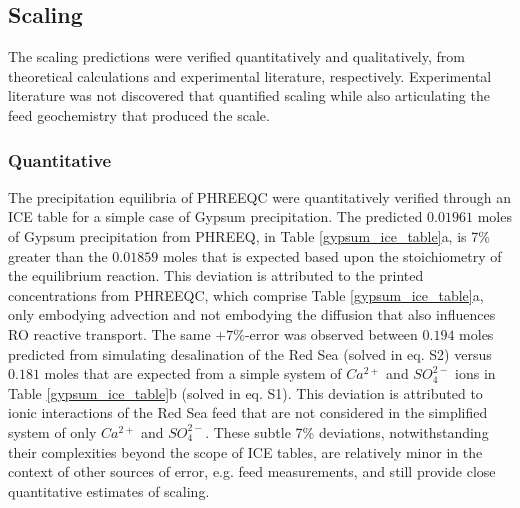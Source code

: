 \subsection{Scaling}
The scaling predictions were verified quantitatively and qualitatively, from theoretical calculations and experimental literature, respectively. Experimental literature was not discovered that quantified scaling while also articulating the feed geochemistry that produced the scale. 

\subsubsection{Quantitative}
The precipitation equilibria of PHREEQC were quantitatively verified through an ICE table for a simple case of Gypsum precipitation. The predicted $0.01961$ moles of Gypsum precipitation from PHREEQ, in Table \ref{gypsum_ice_table}a, is 7\% greater than the $0.01859$ moles that is expected based upon the stoichiometry of the equilibrium reaction. This deviation is attributed to the printed concentrations from PHREEQC, which comprise Table \ref{gypsum_ice_table}a, only embodying advection and not embodying the diffusion that also influences RO reactive transport. The same $+7\%$-error was observed between $0.194$ moles predicted from simulating desalination of the Red Sea (solved in eq. S2) versus $0.181$ moles that are expected from a simple system of $Ca^{2+}$ and $SO_4^{2-}$ ions in Table \ref{gypsum_ice_table}b (solved in eq. S1). This deviation is attributed to ionic interactions of the Red Sea feed that are not considered in the simplified system of only $Ca^{2+}$ and $SO_4^{2-}$. These subtle 7\% deviations, notwithstanding their complexities beyond the scope of ICE tables, are relatively minor in the context of other sources of error, e.g. feed measurements, and still provide close quantitative estimates of scaling.

